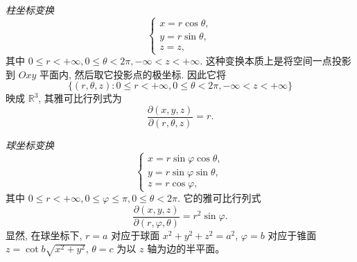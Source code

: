 \documentclass[UTF8,12pt,a4paper,fontset=fandol]{ctexart}
\begin{document}
\noindent\emph{柱坐标变换}
\[
  \begin{cases}
    x=r\cos\theta,\\
    y=r\sin\theta,\\
    z=z,
  \end{cases}
\]
其中 $0\leqslant r<+\infty,0\leqslant\theta<2\pi,-\infty<z<+\infty$. 这种变换本质上是将空间一点投影到 $Oxy$ 平面内, 然后取它投影点的极坐标. 因此它将
\[
  \{(r,\theta,z):0\leqslant r<+\infty,0\leqslant\theta<2\pi,-\infty<z<+\infty\}
\]
映成 $\mathbb R^3$, 其雅可比行列式为
\[
  \frac{\partial(x,y,z)}{\partial(r,\theta,z)}=r.
\]

\noindent\emph{球坐标变换}
\[
  \begin{cases}
    x=r\sin\varphi\cos\theta,\\
    y=r\sin\varphi\sin\theta,\\
    z=r\cos\varphi,
  \end{cases}
\]
其中 $0\leqslant r<+\infty,0\leqslant\varphi\leqslant\pi,0\leqslant\theta<2\pi$. 它的雅可比行列式
\[
  \frac{\partial(x,y,z)}{\partial(r,\varphi,\theta)}=r^2\sin\varphi.
\]
显然, 在球坐标下, $r=a$ 对应于球面 $x^2+y^2+z^2=a^2$, $\varphi=b$ 对应于锥面 $z=\cot b\sqrt{x^2+y^2}$, $\theta=c$ 为以 $z$ 轴为边的半平面。
\end{document}
